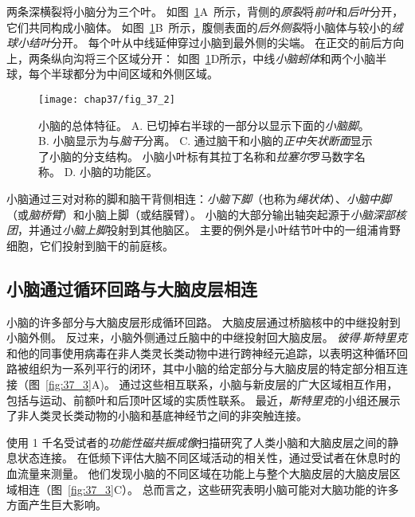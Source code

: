 两条深横裂将小脑分为三个叶。
如图~\ref{fig:37_2}A~所示，背侧的\textit{原裂}将\textit{前叶}和\textit{后叶}分开，它们共同构成小脑体。
如图~\ref{fig:37_2}B~所示，腹侧表面的\textit{后外侧裂}将小脑体与较小的\textit{绒球小结叶}分开。
每个叶从中线延伸穿过小脑到最外侧的尖端。
在正交的前后方向上，两条纵向沟将三个区域分开：
如图~\ref{fig:37_2}D所示，中线\textit{小脑蚓体}和两个小脑半球，每个半球都分为中间区域和外侧区域。


\begin{figure}[htbp]
	\centering
	\texttt{[image: chap37/fig\_37\_2]}
	\caption{小脑的总体特征\cite{nieuwenhuys2007human}。
		A. 已切掉右半球的一部分以显示下面的\textit{小脑脚}。
		B. 小脑显示为与\textit{脑干}分离。
		C. 通过脑干和小脑的\textit{正中矢状断面}显示了小脑的分支结构。
		小脑小叶标有其拉丁名称和\textit{拉塞尔}罗马数字名称\cite{larsell1972comparative}。
		D. 小脑的功能区。}
	\label{fig:37_2}
\end{figure}


小脑通过三对对称的脚和脑干背侧相连：\textit{小脑下脚}（也称为\textit{绳状体}）、\textit{小脑中脚}（或\textit{脑桥臂}）和小脑上脚（或结膜臂）。
小脑的大部分输出轴突起源于\textit{小脑深部核团}，并通过\textit{小脑上脚}投射到其他脑区。
主要的例外是小叶结节叶中的一组浦肯野细胞，它们投射到脑干的前庭核。



\subsection{小脑通过循环回路与大脑皮层相连}

小脑的许多部分与大脑皮层形成循环回路。
大脑皮层通过桥脑核中的中继投射到小脑外侧。
反过来，小脑外侧通过丘脑中的中继投射回大脑皮层。
\textit{彼得$\cdot$斯特里克}和他的同事使用病毒在非人类灵长类动物中进行跨神经元追踪，以表明这种循环回路被组织为一系列平行的闭环，其中小脑的给定部分与大脑皮层的特定部分相互连接（图~\ref{fig:37_3}A)。
通过这些相互联系，小脑与新皮层的广大区域相互作用，包括与运动、前额叶和后顶叶区域的实质性联系。
最近，\textit{斯特里克}的小组还展示了非人类灵长类动物的小脑和基底神经节之间的非突触连接。


使用 1 千名受试者的\textit{功能性磁共振成像}扫描研究了人类小脑和大脑皮层之间的静息状态连接。
在低频下评估大脑不同区域活动的相关性，通过受试者在休息时的血流量来测量。
他们发现小脑的不同区域在功能上与整个大脑皮层的大脑皮层区域相连（图~\ref{fig:37_3}C）。
总而言之，这些研究表明小脑可能对大脑功能的许多方面产生巨大影响。



